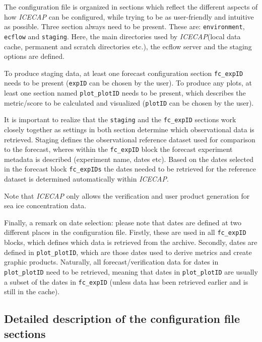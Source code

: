 \documentclass[DIV=10, parskip=full]{scrreprt}
\newcommand{\ice}{\textit{ICECAP}\xspace}
\begin{document}
The configuration file is organized in sections which reflect the different aspects of how \ice can be configured, while trying to be as user-friendly and intuitive as possible. Three section always need to be present. These are: \texttt{environment}, \texttt{ecflow} and \texttt{staging}. Here, the main directories used by \ice (local data cache, permanent and scratch directories etc.), the ecflow server and the staging options are defined. 


To produce staging data, at least one forecast configuration section \texttt{fc\_expID} needs to be present (\texttt{expID} can be chosen by the user). To produce any plots, at least one section named \texttt{plot\_plotID} needs to be present, which describes the metric/score to be calculated and visualized (\texttt{plotID} can be chosen by the user). 

It is important to realize that the \texttt{staging} and the \texttt{fc\_expID} sections work closely together as settings in both section determine which observational data is retrieved. Staging defines the observational reference dataset used for comparison to the forecast, wheres within the \texttt{fc\_expID} block the forecast experiment metadata is described (experiment name, dates etc). Based on the dates selected in the forecast block \texttt{fc\_expIDs} the dates needed to be retrieved for the reference dataset is determined automatically within \ice.

Note that \ice only allows the verification and user product generation for sea ice concentration data.


Finally, a remark on date selection: please note that dates are defined at two different places in the configuration file. Firstly, these are used in all \texttt{fc\_expID} blocks, which defines which data is retrieved from the archive. Secondly, dates are defined in \texttt{plot\_plotID}, which are those dates used to derive metrics and create graphic products. Naturally, all forecast/verification data for dates in \texttt{plot\_plotID} need to be retrieved, meaning that dates in \texttt{plot\_plotID} are usually a subset of the dates in \texttt{fc\_expID} (unless data has been retrieved earlier and is still in the cache).

\subsection{Detailed description of the configuration file sections}
\end{document}

